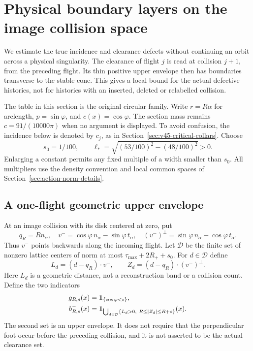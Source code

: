 \section{Physical boundary layers on the image collision space}
\label{sec:v49-physical-layers}
We estimate the true incidence and clearance defects without continuing
an orbit across a physical singularity. The clearance of flight $j$ is
read at collision $j+1$, from the preceding flight. Its thin positive
upper envelope then has boundaries transverse to the stable cone.
This gives a local bound for the actual defective histories, not for
histories with an inserted, deleted or relabelled collision.

The table in this section is the original circular family. Write
$r=R\alpha$ for arclength, $p=\sin\varphi$, and
$c(x)=\cos\varphi$. The section mass remains
$c=91/(10000\pi)$ when no argument is displayed. To avoid confusion,
the incidence below is denoted by $c_j$, as in
Section~\ref{sec:v45-critical-collars}. Choose
\[
 s_0=1/100,\qquad
 \ell_* =\sqrt{(53/100)^2-(48/100)^2}>0.
\]
Enlarging a constant permits any fixed multiple of a width smaller
than $s_0$. All multipliers use the density convention and local
common spaces of Section~\ref{sec:action-norm-details}.

\subsection{A one-flight geometric upper envelope}
At an image collision with its disk centered at zero, put
\[
 q_R=Rn_\alpha,\quad
 v^- =\cos\varphi\,n_\alpha-\sin\varphi\,t_\alpha,\quad
 (v^-)^\perp=\sin\varphi\,n_\alpha+\cos\varphi\,t_\alpha.
\]
Thus $v^-$ points backwards along the incoming flight. Let $\mathcal D$
be the finite set of nonzero lattice centers of norm at most
$\tau_{\max}+2R_++s_0$. For $d\in\mathcal D$ define
\begin{equation}\label{eq:v49-backward-distance}
 L_d=(d-q_R)\cdot v^-,\qquad
 Z_d=(d-q_R)\cdot(v^-)^\perp.
\end{equation}
Here $L_d$ is a geometric distance, not a reconstruction band or a
collision count. Define the two indicators
\begin{align}
 g_{R,s}(x)&=\one_{\{\cos\varphi<s\}},\notag\\
 b_{R,s}^-(x)&=\one_{\bigcup_{d\in\mathcal D}
           \{L_d>0,\ R\le |Z_d|\le R+s\}}(x).
                                      \label{eq:v49-layer-indicators}
\end{align}
The second set is an upper envelope. It does not require that the
perpendicular foot occur before the preceding collision, and it is
not asserted to be the actual clearance set.

